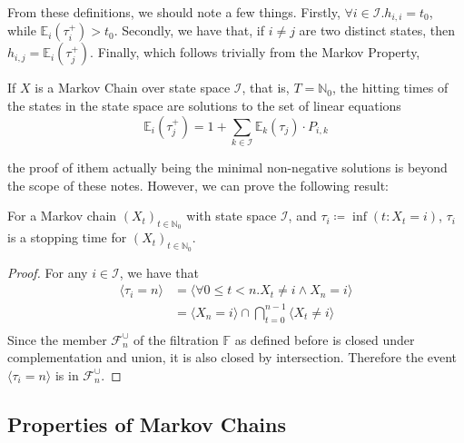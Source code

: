 		From these definitions, we should note a few things. Firstly, $\forall i\in \mathcal{I}. h_{i,i}=
		t_0$, while $\mathbb{E}_i(\tau_i^+) > t_0$. Secondly, we have that, if $i \neq j$ are two distinct
		states, then $h_{i,j} = \mathbb{E}_i(\tau_j^+)$. Finally, which follows trivially from the Markov 
		Property,
		\begin{lemma}
			If $X$ is a Markov Chain over state space $\mathcal{I}$, that is, $T = \mathbb{N}_0$, 
			the hitting times of the states in the state space are solutions to the 
			set of linear equations
			$$
				\mathbb{E}_i(\tau_j^+) = 1 +\sum_{k\in\mathcal{I}} \mathbb{E}_k(\tau_j) 
				\cdot P_{i, k}
			$$
		\end{lemma}
		the proof of ithem actually being the minimal non-negative solutions is beyond the scope of these 
		notes. However, we can prove the following result:
		\begin{lemma}
			For a Markov chain $(X_t)_{t \in \mathbb{N}_0}$ with state space $\mathcal{I}$, and 
			$\tau_i \coloneqq \inf(t : X_t = i)$, $\tau_i$ is a stopping time for $(X_t)_{t\in 
			\mathbb{N}_0}$.
		\end{lemma}
		\begin{proof}
			For any $i \in \mathcal{I}$, we have that 
			\begin{align*}
				\langle\tau_i = n\rangle &= \langle \forall 0 \leq t < n . X_t \neq i \land
				X_n=i\rangle \\
				&= \langle X_n = i\rangle \cap \bigcap_{t=0}^{n-1} \langle X_t \neq i \rangle \\
			\end{align*}
			Since the member $\mathcal{F}^\cup_n$ of the filtration $\mathbb{F}$ as defined before is
			closed under complementation and union, it is also closed by intersection. Therefore the 
			event $\langle \tau_i = n \rangle$ is in $\mathcal{F}_n^{\cup}$.
		\end{proof}
		
	\subsection{Properties of Markov Chains}
		
